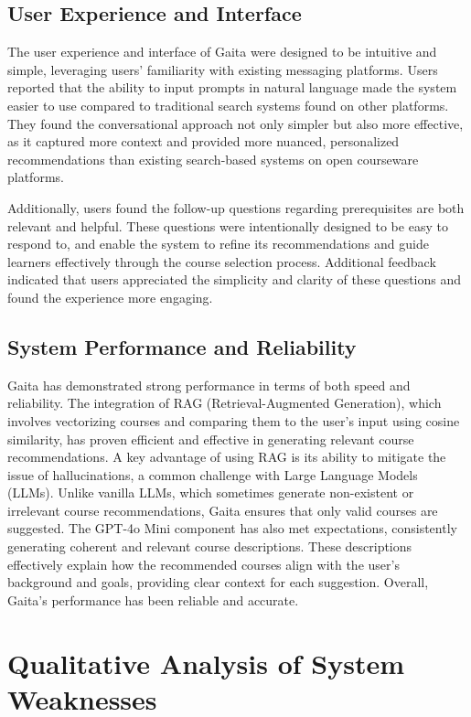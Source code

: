 \subsection{User Experience and Interface}

The user experience and interface of Gaita were designed to be intuitive and simple, leveraging users' familiarity with existing messaging platforms. Users reported that the ability to input prompts in natural language made the system easier to use compared to traditional search systems found on other platforms. They found the conversational approach not only simpler but also more effective, as it captured more context and provided more nuanced, personalized recommendations than existing search-based systems on open courseware platforms.

Additionally, users found the follow-up questions regarding prerequisites are both relevant and helpful. These questions were intentionally designed to be easy to respond to, and enable the system to refine its recommendations and guide learners effectively through the course selection process. Additional feedback indicated that users appreciated the simplicity and clarity of these questions and found the experience more engaging. 

\subsection{System Performance and Reliability}

Gaita has demonstrated strong performance in terms of both speed and reliability. The integration of RAG (Retrieval-Augmented Generation), which involves vectorizing courses and comparing them to the user’s input using cosine similarity, has proven efficient and effective in generating relevant course recommendations. A key advantage of using RAG is its ability to mitigate the issue of hallucinations, a common challenge with Large Language Models (LLMs). Unlike vanilla LLMs, which sometimes generate non-existent or irrelevant course recommendations, Gaita ensures that only valid courses are suggested. The GPT-4o Mini component has also met expectations, consistently generating coherent and relevant course descriptions. These descriptions effectively explain how the recommended courses align with the user’s background and goals, providing clear context for each suggestion. Overall, Gaita's performance has been reliable and accurate.

\section{Qualitative Analysis of System Weaknesses}

